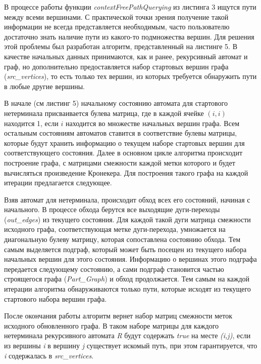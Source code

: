 В процессе работы функции \textit{contextFreePathQuerying} из листинга 3 ищутся пути между всеми вершинами. С практической точки зрения получение такой информации не всегда представляется необходимым, часто пользователю достаточно знать наличие пути из какого-то подмножества вершин. Для решения этой проблемы был разработан алгоритм, представленный на листинге 5. В качестве начальных данных принимаются, как и ранее, рекурсивный автомат и граф, но дополнительно предоставляется набор стартовых вершин графа (\textit{src\_vertices}), то есть только тех вершин, из которых требуется обнаружить пути в любые другие вершины. 

В начале (см листинг 5) начальному состоянию автомата для стартового нетерминала присваивается булева матрица, где в каждой ячейке $(i, i)$ находится 1, если $i$ находится во множестве начальных вершин графа. Всем остальным состояниям автоматов ставится в соответствие булевы матрицы, которые будут хранить информацию о текущем наборе стартовых вершин для соответствующего состояния. Далее в основном цикле алгоритма происходит построение графа, с матрицами смежности каждой метки которого и будет вычисляться произведение Кронекера. Для построения такого графа на каждой итерации предлагается следующее.

Взяв автомат для нетерминала, происходит обход всех его состояний, начиная с начального. В процессе обхода берутся все выходящие дуги-переходы (\textit{out\_edges}) из текущего состояния. Для каждой такой дуги матрица смежности исходного графа, соответствующая метке дуги-перехода, умножается на диагональную булеву матрицу, которая сопоставлена состоянию обхода. Тем самым выделяется подграф, который может быть посещен из текущего набора начальных вершин для этого состояния. Информацию о вершинах этого подграфа передается следующему состоянию, а сами подграф становится частью строящегося графа (\textit{Part\_Graph}) и обход продолжается. Тем самым на каждой итерации алгоритма обнаруживаются только пути, которые исходят из текущего стартового набора вершин графа.

После окончания работы алгоритм вернет набор матриц смежности меток исходного обновленного графа. В таком наборе матрицы для каждого нетерминала рекурсивного автомата \textit{R} будут содержать \textit{true} на месте \textit{(i,j)}, если из вершины \textit{i} в вершину \textit{j} существует искомый путь, при этом гарантируется, что \textit{i} содержалась в \textit{src\_vertices}. 

